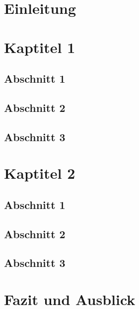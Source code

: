 \chapter{Einleitung}
\lipsum[1-4]

\chapter{Kaptitel 1}
\lipsum[1-2]
\section{Abschnitt 1}
\lipsum[1-2]
\section{Abschnitt 2}
\lipsum[1-2]
\section{Abschnitt 3}
\lipsum[1-2]

\chapter{Kaptitel 2}
\lipsum[1-2]
\section{Abschnitt 1}
\lipsum[1-2]
\section{Abschnitt 2}
\lipsum[1-2]
\section{Abschnitt 3}
\lipsum[1-2]

\chapter{Fazit und Ausblick}
\lipsum[1-4]
